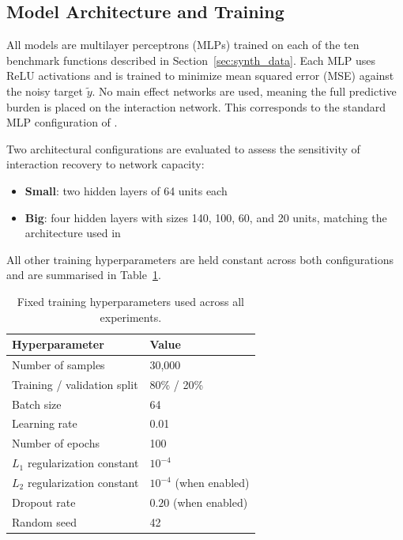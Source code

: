 \documentclass{article}
\begin{document}
\subsection{Model Architecture and Training}

All models are multilayer perceptrons (MLPs) trained on each of the ten 
benchmark functions described in Section~\ref{sec:synth_data}. Each MLP uses ReLU 
activations and is trained to minimize mean squared error (MSE) against the 
noisy target $\tilde{y}$. No main effect networks are used, meaning the full 
predictive burden is placed on the interaction network. This corresponds to 
the standard MLP configuration of \cite{tsang2017detecting}.

Two architectural configurations are evaluated to assess the sensitivity of 
interaction recovery to network capacity:
\begin{itemize}
    \item \textbf{Small}: two hidden layers of 64 units each
    \item \textbf{Big}: four hidden layers with sizes 140, 100, 60, and 20 
    units, matching the architecture used in \cite{tsang2017detecting}
\end{itemize}

All other training hyperparameters are held constant across both 
configurations and are summarised in Table~\ref{tab:hyperparameters}.

\begin{table}[ht]
\centering
\caption{Fixed training hyperparameters used across all experiments.}
\label{tab:hyperparameters}
\begin{tabular}{ll}
\toprule
\textbf{Hyperparameter} & \textbf{Value} \\
\midrule
Number of samples           & 30,000 \\
Training / validation split & 80\% / 20\% \\
Batch size                  & 64 \\
Learning rate               & 0.01 \\
Number of epochs            & 100 \\
$L_1$ regularization constant & $10^{-4}$ \\
$L_2$ regularization constant & $10^{-4}$ (when enabled) \\
Dropout rate                & $0.20$ (when enabled) \\
Random seed                 & 42 \\
\bottomrule
\end{tabular}
\end{table}
\end{document}
